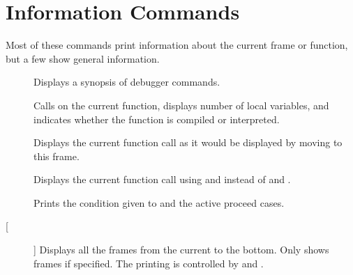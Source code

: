 \section{Information Commands}

Most of these commands print information about the current frame or
function, but a few show general information.

\begin{description}

\item[]
Displays a synopsis of debugger commands.

\item[]
Calls  on the current function, displays number of local
variables, and indicates whether the function is compiled or interpreted.

\item[]
Displays the current function call as it would be displayed by moving to
this frame.

\item[]
Displays the current function call using  and
 instead of  and
.

\item[]
Prints the condition given to  and the active
proceed cases.

\item[ []]
Displays all the frames from the current to the bottom.  Only shows
 frames if specified.  The printing is controlled by
 and .

\end{description}

